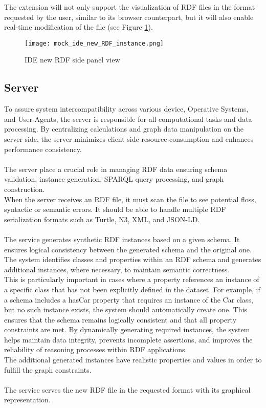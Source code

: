   The extension will not only support the visualization of RDF files in the format requested by the user, similar to its browser counterpart, but it will also enable real-time modification of the file (see Figure \ref{fig:IDERDFReader}).

  \begin{figure}[htb]
      \centering
      \texttt{[image: mock\_ide\_new\_RDF\_instance.png]}\\
      \caption{IDE new RDF side panel view}\label{fig:IDERDFReader}
    \end{figure}

  \subsection{Server\label{sec:server}}
  To assure system intercompatibility across various device, Operative Systems, and User-Agents, the server is responsible for all computational tasks and data processing. By centralizing calculations and graph data manipulation on the server side, the server minimizes client-side resource consumption and enhances performance consistency. 
  \\
  \\
  The server place a crucial role in managing RDF data ensuring  schema validation, instance generation, SPARQL query processing, and graph construction.
  \\
  When the server receives an RDF file, it must scan the file to see potential floss, syntactic or semantic errors. It should be able to handle multiple RDF serialization formats such as Turtle, N3, XML, and JSON-LD. 
  \\
  \\
  The service generates synthetic RDF instances based on a given schema. It ensures logical consistency between the generated schema and the original one.
  \\
  The system identifies classes and properties within an RDF schema and generates additional instances, where necessary, to maintain semantic correctness. 
  \\
  This is particularly important in cases where a property references an instance of a specific class that has not been explicitly defined in the dataset.
  For example, if a schema includes a hasCar property that requires an instance of the Car class, but no such instance exists, the system should automatically create one. This ensures that the schema remains logically consistent and that all property constraints are met. By dynamically generating required instances, the system helps maintain data integrity, prevents incomplete assertions, and improves the reliability of reasoning processes within RDF applications.
  \\ 
  The additional generated instances have realistic properties and values in order to fulfill the graph constraints.
  \\
  \\
  The service serves the new RDF file in the requested format with its graphical representation.


